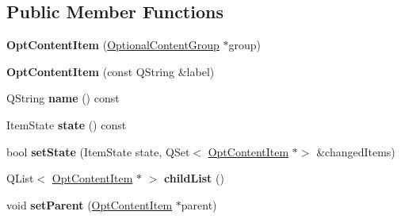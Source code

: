 \subsection*{Public Member Functions}
\begin{DoxyCompactItemize}
\item 
\mbox{\label{class_poppler_1_1_opt_content_item_ad18030636342eff04aed6c6b17edac96}} 
{\bfseries Opt\+Content\+Item} (\hyperlink{class_optional_content_group}{Optional\+Content\+Group} $\ast$group)
\item 
\mbox{\label{class_poppler_1_1_opt_content_item_aa54d9758e9332729de68162a18d9ef7d}} 
{\bfseries Opt\+Content\+Item} (const Q\+String \&label)
\item 
\mbox{\label{class_poppler_1_1_opt_content_item_afc90835566d6e6528459ba0a876c7f83}} 
Q\+String {\bfseries name} () const
\item 
\mbox{\label{class_poppler_1_1_opt_content_item_adf668477ee688e8a7b85a7a144d03d84}} 
Item\+State {\bfseries state} () const
\item 
\mbox{\label{class_poppler_1_1_opt_content_item_a10347f849da2509223765ff67456c72e}} 
bool {\bfseries set\+State} (Item\+State state, Q\+Set$<$ \hyperlink{class_poppler_1_1_opt_content_item}{Opt\+Content\+Item} $\ast$$>$ \&changed\+Items)
\item 
\mbox{\label{class_poppler_1_1_opt_content_item_a9305e30a55aa535c393a45742ffe750b}} 
Q\+List$<$ \hyperlink{class_poppler_1_1_opt_content_item}{Opt\+Content\+Item} $\ast$ $>$ {\bfseries child\+List} ()
\item 
\mbox{\label{class_poppler_1_1_opt_content_item_aab7a9f224a37a3e2a44fa450fae96667}} 
void {\bfseries set\+Parent} (\hyperlink{class_poppler_1_1_opt_content_item}{Opt\+Content\+Item} $\ast$parent)
\item 
\mbox{\label{class_poppler_1_1_opt_content_item_a9f01a437bdb9c593a038e4bf8856282e}} 
$$
\end{DoxyCompactItemize}
